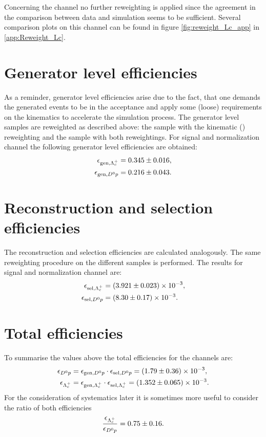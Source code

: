 Concerning the channel \LbToLcmunu no further reweighting is applied since the agreement in the comparison between data and simulation seems to be sufficient.
Several comparison plots on this channel can be found in figure \ref{fig:reweight_Lc_app} in \ref{app:Reweight_Lc}.


\section{Generator level efficiencies}
As a reminder, generator level efficiencies arise due to the fact, that one demands the generated events to be in the \lhcb acceptance and apply some (loose) requirements on the kinematics to accelerate the simulation process.
The generator level samples are reweighted as described above: the \LbToLcmunu sample with the kinematic \pt(\Lb) reweighting and the \LbToDpmunu sample with both reweightings.
For signal and normalization channel the following generator level efficiencies are obtained:
\begin{align*}
    \effGenLc &= \effGenLcval \pm \effGenLcerr, \\
    \effGenDp &= \effGenDpval \pm \effGenDperr.
\end{align*}

\section{Reconstruction and selection efficiencies}
The reconstruction and selection efficiencies are calculated analogously.
The same reweighting procedure on the different samples is performed.
The results for signal and normalization channel are:
\begin{align*}
    \effSelLc &= \num[scientific-notation=true]{\effSelLcval \pm \effSelLcerr}, \\
    \effSelDp &= \num[scientific-notation=true]{\effSelDpval \pm \effSelDperr}.
\end{align*}

\section{Total efficiencies}
To summarise the values above the total efficiencies for the channels are:
\begin{align*}
    \effDp &= \effGenDp \cdot \effSelDp = \num[scientific-notation=true]{\effDpval \pm \effDperr}, \\
    \effLc &= \effGenLc \cdot \effSelLc = \num[scientific-notation=true]{\effLcval \pm \effLcerr}.
\end{align*}
For the consideration of systematics later it is sometimes more useful to consider the ratio of both efficiencies
\begin{align*}
    \frac{\effLc}{\effDp} = \effRatioval \pm \effRatioerr.
\end{align*}
